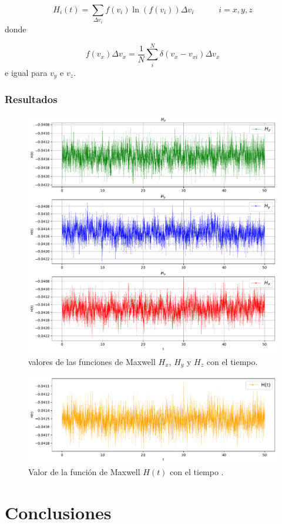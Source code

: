 \documentclass[11pt]{article} %
\newcommand{\tquad}{\quad \quad \quad}
\begin{document}
\begin{equation}
	H_i (t) = \sum_{\Delta v_i} f(v_i) \ln (f(v_i)) \Delta v_i  \tquad i=x,y,z
\end{equation}
donde

\begin{equation}
	f(v_x) \Delta v_x = \frac{1}{N} \sum_i^N \delta (v_x-v_{xi}) \Delta v_x
\end{equation}
e igual para $v_y$ e $v_z$. 

\subsubsection{Resultados}
	
	
	\begin{figure}[h!] \centering
		\includegraphics[width=1.0\textwidth]{../../Graficas/H_Boltzmann_xyz.pdf}
		\caption{valores de las funciones de Maxwell $H_x$, $H_y$ y $H_z$ con el tiempo.}
		\label{Fig:05}
	\end{figure}
	
	\begin{figure}[h!] \centering
		\includegraphics[width=1.0\textwidth]{../../Graficas/H_Boltzmann.pdf}
		\caption{Valor de la función de Maxwell $H(t)$ con el tiempo .}
		\label{Fig:04}
	\end{figure}	
	
	
\section{Conclusiones}
	
	


	
	
\end{document}
